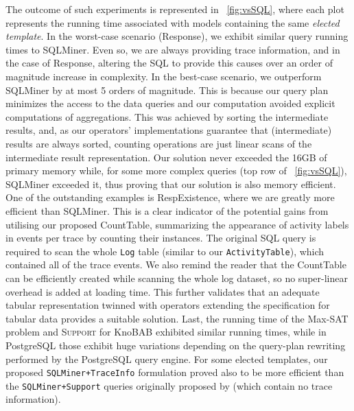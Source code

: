 The outcome of such experiments is represented in \figurename~\ref{fig:vsSQL}, where each plot represents the running time associated with models containing the same \textit{elected template}. In the worst-case scenario (\textsf{Response}), we exhibit similar query running times to SQLMiner. Even so, we are always providing trace information, and in the case of \textsf{Response}, altering the SQL to provide this causes over an order of magnitude increase in complexity. In the best-case scenario, we outperform SQLMiner by at most 5 orders of magnitude. This is because our query plan minimizes the access to the data queries and our computation avoided explicit computations of aggregations. This was achieved by sorting the intermediate results, and, as our operators' implementations guarantee that (intermediate) results are always sorted, counting operations are just linear scans of the intermediate result representation. Our solution never exceeded the 16GB of primary memory while, for some more complex queries (top row of \figurename~\ref{fig:vsSQL}), SQLMiner exceeded it, thus proving that our solution is also memory efficient. One of the outstanding examples is \textsf{RespExistence}, where we are greatly more efficient than SQLMiner. This is a clear indicator of the potential gains from utilising our proposed \textsf{CountTable}, summarizing the appearance of activity labels in events per trace by counting their instances. The original SQL query is required to scan the whole \texttt{Log} table (similar to our \texttt{ActivityTable}), which contained all of the trace events. We also remind the reader that the \textsf{CountTable} can be efficiently created while scanning the whole log dataset, so no super-linear overhead is added at loading time. This further validates that an adequate tabular representation twinned with \xLTLf operators extending the \LTLf specification for tabular data provides a suitable solution. Last, the running time of the Max-SAT problem and \textsc{Support} for KnoBAB exhibited similar running times, while in PostgreSQL those exhibit huge variations depending on the query-plan rewriting performed by the PostgreSQL query engine. For some elected templates, our proposed \texttt{SQLMiner+TraceInfo} formulation proved also to be more efficient than the \texttt{SQLMiner+Support} queries originally proposed by \cite{Schonig15} (which contain no trace information).




